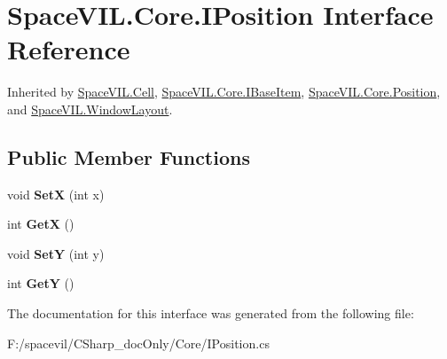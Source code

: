 \hypertarget{interface_space_v_i_l_1_1_core_1_1_i_position}{}\section{Space\+V\+I\+L.\+Core.\+I\+Position Interface Reference}
\label{interface_space_v_i_l_1_1_core_1_1_i_position}


Inherited by \mbox{\hyperlink{class_space_v_i_l_1_1_cell}{Space\+V\+I\+L.\+Cell}}, \mbox{\hyperlink{interface_space_v_i_l_1_1_core_1_1_i_base_item}{Space\+V\+I\+L.\+Core.\+I\+Base\+Item}}, \mbox{\hyperlink{class_space_v_i_l_1_1_core_1_1_position}{Space\+V\+I\+L.\+Core.\+Position}}, and \mbox{\hyperlink{class_space_v_i_l_1_1_window_layout}{Space\+V\+I\+L.\+Window\+Layout}}.

\subsection*{Public Member Functions}
\begin{DoxyCompactItemize}
\item 
\mbox{\label{interface_space_v_i_l_1_1_core_1_1_i_position_a9a98baa12afe5da8cdc553d0ce25369f}} 
void {\bfseries SetX} (int x)
\item 
\mbox{\label{interface_space_v_i_l_1_1_core_1_1_i_position_a67fb53a55aadf1038903346778b41318}} 
int {\bfseries GetX} ()
\item 
\mbox{\label{interface_space_v_i_l_1_1_core_1_1_i_position_afdecfb9237eb56c074b391fc2ad8fe5b}} 
void {\bfseries SetY} (int y)
\item 
\mbox{\label{interface_space_v_i_l_1_1_core_1_1_i_position_a2d11f35d825eba597abb021e7f146f06}} 
int {\bfseries GetY} ()
\end{DoxyCompactItemize}


The documentation for this interface was generated from the following file\+:\begin{DoxyCompactItemize}
\item 
F\+:/spacevil/\+C\+Sharp\+\_\+doc\+Only/\+Core/I\+Position.\+cs\end{DoxyCompactItemize}
